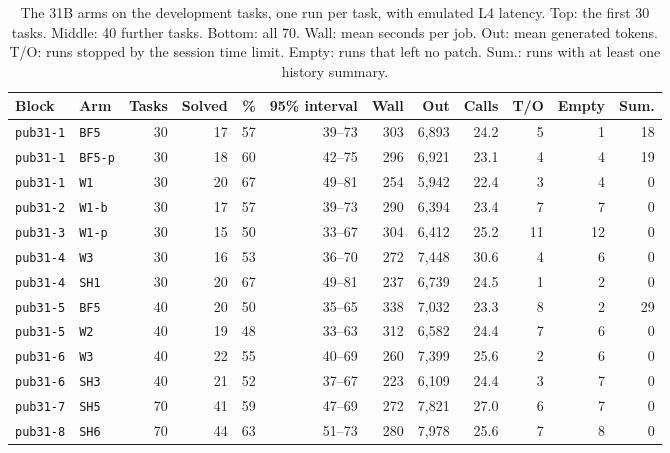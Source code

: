 \begin{table}[t]
\centering
\footnotesize
\caption{The 31B arms on the development tasks, one run per task, with emulated L4 latency. Top: the first 30 tasks. Middle: 40 further tasks. Bottom: all 70. Wall: mean seconds per job. Out: mean generated tokens. T/O: runs stopped by the session time limit. Empty: runs that left no patch. Sum.: runs with at least one history summary.}
\label{tab:pubarms}
\begin{tabular}{llrrrrrrrrrr}
\toprule
Block & Arm & Tasks & Solved & \% & 95\% interval & Wall & Out & Calls & T/O & Empty & Sum. \\
\midrule
\texttt{pub31-1} & \texttt{BF5} & 30 & 17 & 57 & 39--73 & 303 & 6{,}893 & 24.2 & 5 & 1 & 18 \\
\texttt{pub31-1} & \texttt{BF5-p} & 30 & 18 & 60 & 42--75 & 296 & 6{,}921 & 23.1 & 4 & 4 & 19 \\
\texttt{pub31-1} & \texttt{W1} & 30 & 20 & 67 & 49--81 & 254 & 5{,}942 & 22.4 & 3 & 4 & 0 \\
\texttt{pub31-2} & \texttt{W1-b} & 30 & 17 & 57 & 39--73 & 290 & 6{,}394 & 23.4 & 7 & 7 & 0 \\
\texttt{pub31-3} & \texttt{W1-p} & 30 & 15 & 50 & 33--67 & 304 & 6{,}412 & 25.2 & 11 & 12 & 0 \\
\texttt{pub31-4} & \texttt{W3} & 30 & 16 & 53 & 36--70 & 272 & 7{,}448 & 30.6 & 4 & 6 & 0 \\
\texttt{pub31-4} & \texttt{SH1} & 30 & 20 & 67 & 49--81 & 237 & 6{,}739 & 24.5 & 1 & 2 & 0 \\
\addlinespace
\texttt{pub31-5} & \texttt{BF5} & 40 & 20 & 50 & 35--65 & 338 & 7{,}032 & 23.3 & 8 & 2 & 29 \\
\texttt{pub31-5} & \texttt{W2} & 40 & 19 & 48 & 33--63 & 312 & 6{,}582 & 24.4 & 7 & 6 & 0 \\
\texttt{pub31-6} & \texttt{W3} & 40 & 22 & 55 & 40--69 & 260 & 7{,}399 & 25.6 & 2 & 6 & 0 \\
\texttt{pub31-6} & \texttt{SH3} & 40 & 21 & 52 & 37--67 & 223 & 6{,}109 & 24.4 & 3 & 7 & 0 \\
\addlinespace
\texttt{pub31-7} & \texttt{SH5} & 70 & 41 & 59 & 47--69 & 272 & 7{,}821 & 27.0 & 6 & 7 & 0 \\
\texttt{pub31-8} & \texttt{SH6} & 70 & 44 & 63 & 51--73 & 280 & 7{,}978 & 25.6 & 7 & 8 & 0 \\
\bottomrule
\end{tabular}
\end{table}
